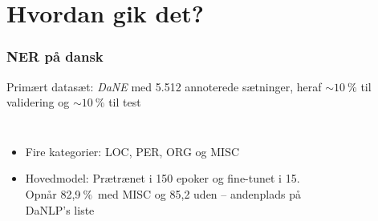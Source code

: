 \documentclass{beamer}
\newcommand{\unit}[1]{\ensuremath{\:\text{#1}}}
\newcommand{\pro}{\ensuremath{\unit{\%{}}}}
\begin{document}
\section{Hvordan gik det?}
\begin{frame}
    \frametitle{NER på dansk}
    Primært datasæt: \emph{DaNE} med 5.512 annoterede sætninger, heraf $ \sim 10\pro $ til validering og $ \sim 10\pro $ til test
    \begin{columns}
        \begin{itemize}
            \item Fire kategorier: LOC, PER, ORG og MISC
            \item Hovedmodel: Prætrænet i 150 epoker og fine-tunet i 15.
            Opnår 82,9\pro\ med MISC og 85,2 uden -- andenplads på DaNLP's liste
        \end{itemize}
        \begin{figure}[H]
            \centering
            \begin{overlayarea}{\textwidth}{4cm}
            \end{overlayarea}
        \end{figure}
    \end{columns}
\end{frame}
\end{document}
